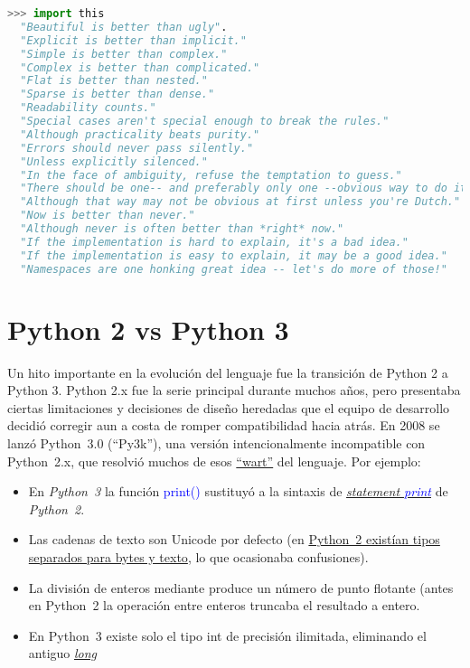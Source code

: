 \begin{lstlisting}[language=Python, caption={El Zen de Python}]
>>> import this
  "Beautiful is better than ugly".
  "Explicit is better than implicit."
  "Simple is better than complex."
  "Complex is better than complicated."
  "Flat is better than nested."
  "Sparse is better than dense."
  "Readability counts."
  "Special cases aren't special enough to break the rules."
  "Although practicality beats purity."
  "Errors should never pass silently."
  "Unless explicitly silenced."
  "In the face of ambiguity, refuse the temptation to guess."
  "There should be one-- and preferably only one --obvious way to do it."
  "Although that way may not be obvious at first unless you're Dutch."
  "Now is better than never."
  "Although never is often better than *right* now."
  "If the implementation is hard to explain, it's a bad idea."
  "If the implementation is easy to explain, it may be a good idea."
  "Namespaces are one honking great idea -- let's do more of those!"
\end{lstlisting}


\section{Python 2 vs Python 3}

Un hito importante en la evolución del lenguaje fue la transición de Python 2 a Python 3. Python 2.x fue la serie principal durante 
muchos años, pero presentaba ciertas limitaciones y decisiones de diseño heredadas que el equipo de desarrollo decidió corregir aun 
a costa de romper compatibilidad hacia atrás. En 2008 se lanzó Python 3.0 (“Py3k”), una versión intencionalmente incompatible con Python 2.x, 
que resolvió muchos de esos \href{https://peps.python.org/pep-0404/#:~:text=Python%20is%20,there%E2%80%99s%20also}{“wart”} del lenguaje.
Por ejemplo:

\begin{itemize}
    
    \item En \textit{Python 3} la función \textcolor{blue}{print()} sustituyó a la sintaxis de \href{https://docs.python.org/3/whatsnew/3.0.html}{\textit{statement \textcolor{blue}{print}}} de 
\textit{Python 2}.

 \item  Las cadenas de texto son Unicode por defecto (en \href{https://peps.python.org/pep-0404/#:~:text=Strings%20and%20bytes}{Python 2 existían tipos separados para bytes y texto}, lo que ocasionaba confusiones).
 
 \item La división de enteros mediante \/ produce un número de punto flotante (antes en Python 2 la operación \/ entre enteros truncaba el resultado a entero.

 \item En Python 3 existe solo el tipo int de precisión ilimitada, eliminando el antiguo \href{https://peps.python.org/pep-0404/#:~:text=Python%202%20has%20two%20basic,type}{\textit{long}}
\end{itemize}

